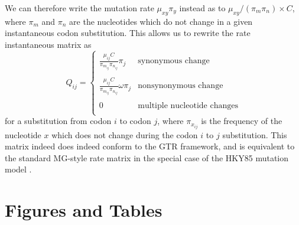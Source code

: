 \documentclass[11pt]{article}
\begin{document}
We can therefore write the mutation rate $\mu_{xy}\pi_y$ instead as to $\mu_{xy} / (\pi_m\pi_n) \times C$, where $\pi_m$ and $\pi_n$ are the nucleotides which do not change in a given instantaneous codon substitution. This allows us to rewrite the rate instantaneous matrix as 
\begin{equation}
Q_{ij} = \left\{ 
\begin{array}{rl}
\frac{\mu_{ij}C}{\pi_{m_{ij}}\pi_{n_{ij}}}\pi_j               &\mbox{synonymous change} \\\\
\frac{\mu_{ij}C}{\pi_{m_{ij}}\pi_{n_{ij}}}\omega\pi_j         &\mbox{nonsynonymous change} \\\\
0                                                     &\mbox{multiple nucleotide changes} \\           
\end{array} \right.
\end{equation} for a substitution from codon $i$ to codon $j$, where $\pi_{x_{ij}}$ is the frequency of the nucleotide $x$ which does not change during the codon $i$ to $j$ substitution. This matrix indeed does indeed conform to the GTR framework, and is equivalent to the standard MG-style rate matrix \cite{MuseGaut1994} in the special case of the HKY85 mutation model \cite{HKY85}.
		
		

		
		


		
		
	
	
\section*{Figures and Tables}

\vspace{2cm}
	
\end{document}
